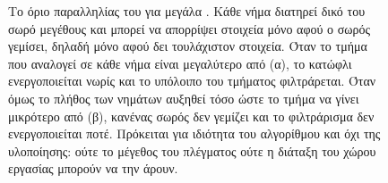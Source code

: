 \begin{figure}[H]
\begin{tikzpicture}[x=1.0cm, y=1.0cm]
    \end{tikzpicture}
    \caption[Το όριο παραλληλίας του ]{Το όριο παραλληλίας του  για μεγάλα . Κάθε νήμα
    διατηρεί δικό του σωρό μεγέθους  και μπορεί να απορρίψει στοιχεία μόνο
    αφού ο σωρός γεμίσει, δηλαδή μόνο αφού δει τουλάχιστον  στοιχεία. Όταν
    το τμήμα που αναλογεί σε κάθε νήμα είναι μεγαλύτερο από  (α), το κατώφλι
    ενεργοποιείται νωρίς και το υπόλοιπο του τμήματος φιλτράρεται. Όταν όμως το
    πλήθος των νημάτων αυξηθεί τόσο ώστε το τμήμα να γίνει μικρότερο από 
    (β), κανένας σωρός δεν γεμίζει και το φιλτράρισμα δεν ενεργοποιείται ποτέ.
    Πρόκειται για ιδιότητα του αλγορίθμου και όχι της υλοποίησης: ούτε το μέγεθος
    του πλέγματος ούτε η διάταξη του χώρου εργασίας μπορούν να την άρουν.}
    \label{fig:gpu-mapreduce-limit}
\end{figure}
